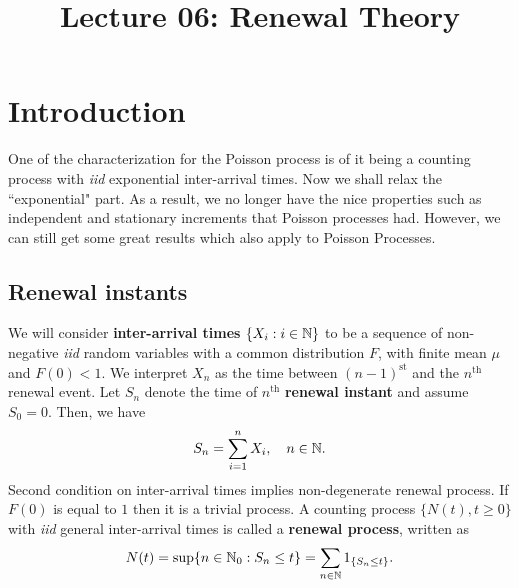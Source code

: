 \documentclass[a4paper,10pt, english]{article}
\title{Lecture 06: Renewal Theory}
\author{}
\begin{document}
\maketitle

\section{Introduction}
One of the characterization for the Poisson process is of it being a counting process with \textit{iid} exponential inter-arrival times. 
Now we shall relax the ``exponential" part. 
As a result, we no longer have the nice properties such as independent and stationary increments that Poisson processes had. 
However, we can still get some great results which also apply to Poisson Processes. 

\subsection{Renewal instants}
We will consider \textbf{inter-arrival times} $\{X_i: i \in \mathbb{N}\}$ to be a sequence of non-negative \textit{iid} random variables with a common distribution $F$, 
with finite mean $\mu$ and $F(0) < 1$. 
We interpret $X_n$ as the time between $(n - 1)^{\text{st}}$ and the $n^{\text{th}}$ renewal event. 
Let $S_n$ denote the time of $n^{\text{th}}$ \textbf{renewal instant} and assume $S_0 = 0$. 
Then, we have
\begin{align*} 
S_n = \sum_{i=1}^n X_i, \quad n\in \mathbb{N}. 
\end{align*}
Second condition on inter-arrival times implies non-degenerate renewal process. 
If $F(0)$ is equal to $1$ then it is a trivial process. 
A counting process $\{N(t),t \geq 0\}$ with \textit{iid} general inter-arrival times is called a \textbf{renewal process}, written as 
	\begin{align*} 
	N(t) = \sup\{n \in \mathbb{N}_0 : S_n \leq t\} = \sum_{n \in \mathbb{N}}1_{\{S_n \leq t\}}.
	\end{align*} 
\end{document}

